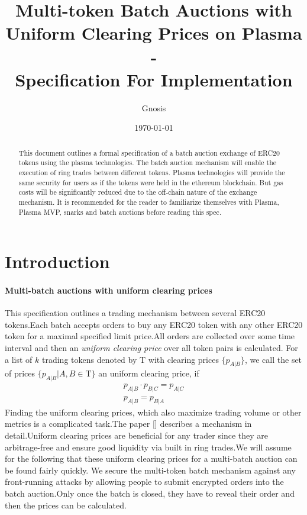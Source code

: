 \documentclass[11pt,parskip=full]{scrartcl}%
\title{
  Multi-token Batch Auctions with Uniform Clearing Prices on Plasma\\
  - \\
  \Large Specification For Implementation}
\author{Gnosis}
\date{\today}
\newcommand{\Tau}{\mathrm{T}}
\begin{document}
\maketitle


\begin{abstract}

This document outlines a formal specification of a batch auction exchange of ERC20 tokens using the plasma technologies.
The batch auction mechanism will enable the execution of ring trades between different tokens.
Plasma technologies will provide the same security for users as if the tokens were held in the ethereum blockchain.
But gas costs will be significantly reduced due to the off-chain nature of the exchange mechanism.
It is recommended for the reader to familiarize themselves with Plasma\cite{plasma}, Plasma MVP\cite{MVP}, snarks\cite{snarks} and batch auctions\cite{batch} before reading this spec.

\end{abstract}

\tableofcontents

\newpage
\section{Introduction}
\label{sec:introduction}

\paragraph{Multi-batch auctions with uniform clearing prices}

This specification outlines a trading mechanism between several ERC20 tokens.Each batch accepts orders to buy any ERC20 token with any other ERC20 token for a maximal specified limit price.All orders are collected over some time interval and then an \emph{uniform clearing price} over all token pairs is calculated.
For a list of $k$ trading tokens denoted by $\Tau$ with clearing prices $\{p_{A|B}\}$, we call the set of prices $\{p_{A|B}| A,B \in \Tau \}$ an uniform clearing price, if
\begin{align}
  p_{A|B} \cdot p_{B|C} = p_{A|C}\\
  p_{A|B} = p_{B|A}
\end{align}
Finding the uniform clearing prices, which also maximize trading volume or other metrics is a complicated task.The paper [] describes a mechanism in detail.Uniform clearing prices are beneficial for any trader since they are arbitrage-free and ensure good liquidity via built in ring trades.We will assume for the following that these uniform clearing prices for a multi-batch auction can be found fairly quickly.\newline
We secure the multi-token batch mechanism against any front-running attacks by allowing people to submit encrypted orders into the batch auction.Only once the batch is closed, they have to reveal their order and then the prices can be calculated.
\end{document}
